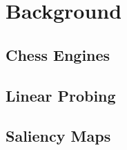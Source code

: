 \section{Background}

\subsection{Chess Engines}

\subsection{Linear Probing}

\subsection{Saliency Maps}
